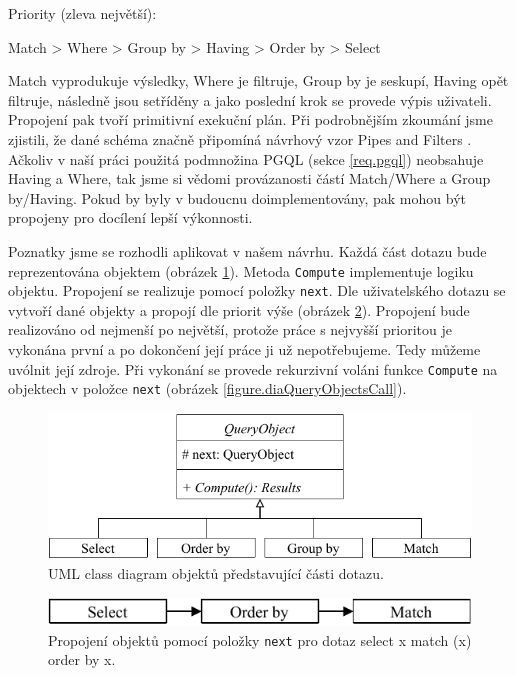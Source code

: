 Priority (zleva největší):
\begin{code}
      Match > Where > Group by > Having > Order by > Select 
\end{code}
Match vyprodukuje výsledky, Where je filtruje, Group by je seskupí, Having opět filtruje, následně jsou setříděny a jako poslední krok se provede výpis uživateli.
Propojení pak tvoří primitivní exekuční plán.
Při podrobnějším zkoumání jsme zjistili, že dané schéma značně připomíná návrhový vzor Pipes and Filters \citep[str. 53]{patterns2}.
Ačkoliv v naší práci použitá podmnožina PGQL (sekce \ref{req.pgql}) neobsahuje Having a Where, tak jsme si vědomi provázanosti částí Match/Where a Group by/Having.
Pokud by byly v budoucnu doimplementovány, pak mohou být propojeny pro docílení lepší výkonnosti. 

Poznatky jsme se rozhodli aplikovat v našem návrhu.
Každá část dotazu bude reprezentována objektem (obrázek \ref{figure.diaQueryObjects}).
Metoda \verb+Compute+ implementuje logiku objektu.
Propojení se realizuje pomocí položky \verb+next+.
Dle uživatelského dotazu se vytvoří dané objekty a propojí dle priorit výše (obrázek \ref{figure.diaQueryObjectsCon}).
Propojení bude realizováno od nejmenší po největší, protože práce s nejvyšší prioritou je vykonána první a po dokončení její práce ji už nepotřebujeme.
Tedy můžeme uvólnit její zdroje.
Při vykonání se provede rekurzivní voláni funkce \texttt{Compute} na objektech v položce \verb+next+ (obrázek \ref{figure.diaQueryObjectsCall}). 

\begin{figure}[!htp]
\includegraphics{../img/diaQueryObjects.pdf}\centering
\caption{UML class diagram objektů představující části dotazu.}
\label{figure.diaQueryObjects}
\end{figure}

\clearpage

\begin{figure}[!htp]
\includegraphics{../img/diaQueryObjectsCon.pdf}\centering
\caption{Propojení objektů pomocí položky \texttt{next} pro dotaz select x match (x) order by x.}
\label{figure.diaQueryObjectsCon}
\end{figure}

